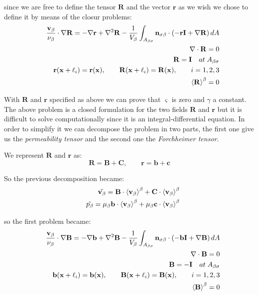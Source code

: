 since we are free to define the tensor $\mathbf{R}$  and the vector $\mathbf{r}$ as we wish we chose to define it by means of the closur problems:
\begin{eqnarray}
&& \dfrac{\textbf{v}_{\beta}}{\nu_{\beta}} \cdot  \nabla \mathbf{R} = -\nabla \mathbf{r} + \nabla^2 \mathbf{R} - \dfrac{1}{V_\beta} \int_{A_{\beta \sigma}} \mathbf{n}_{\sigma \beta} \cdot \left(-\mathbf{r}\mathbf{I}  +  \nabla \mathbf{R} \right) dA  \\
&& \nabla \cdot \mathbf{R} = 0  \\
&&\mathbf{R} = \mathbf{I} \quad at \; A_{\beta \sigma} \\
&& \mathbf{r}(\mathbf{x} +\ell_i) = \mathbf{r}(\mathbf{x}), \qquad \mathbf{R}(\mathbf{x} +\ell_i) = \mathbf{R}(\mathbf{x}), \qquad i=1,2,3 \\
&& {\left< \mathbf{R} \right>}^{\beta} = 0
\label{eq:R_problem}
\end{eqnarray}

With  $\mathbf{R}$ and $\mathbf{r}$ specified as above we can prove that $\boldsymbol{\varsigma}$ is zero and $\gamma$ a constant.
The above problem is a closed formulation for the two fields  $\mathbf{R}$ and $\mathbf{r}$ but it is difficult to solve computationally since it is an integral-differential equation.
In order to simplify it we can decompose the problem in two parts, the first one give us the \textit{permeability tensor} and the second one the \textit{Forchheimer tensor}.

We represent $\mathbf{R}$ and $\mathbf{r}$ as:
$$
 \mathbf{R} = \mathbf{B} + \mathbf{C}, \qquad \mathbf{r} = \mathbf{b} + \mathbf{c}
$$

So the previous decomposition became:
\begin{eqnarray}
	&& \tilde{\textbf{v}_{\beta}} = \mathbf{B} \cdot {\left< \textbf{v}_{\beta}\right>}^{\beta} + \mathbf{C} \cdot {\left< \textbf{v}_{\beta}\right>}^{\beta}  \\
	&& \tilde{p_{\beta}} = \mu_{\beta} \mathbf{b} \cdot {\left< \textbf{v}_{\beta}\right>}^{\beta} + \mu_{\beta} \mathbf{c} \cdot {\left< \textbf{v}_{\beta}\right>}^{\beta} 
\end{eqnarray}

so the first problem became:
\begin{eqnarray}
&& \dfrac{\textbf{v}_{\beta}}{\nu_{\beta}} \cdot  \nabla \mathbf{B} = -\nabla \mathbf{b} + \nabla^2 \mathbf{B} - \dfrac{1}{V_\beta} \int_{A_{\beta \sigma}} \mathbf{n}_{\sigma \beta} \cdot \left(-\mathbf{b}\mathbf{I}  +  \nabla \mathbf{B} \right) dA  \\
&& \nabla \cdot \mathbf{B} = 0  \\
&&\mathbf{B} = -\mathbf{I} \quad at \; A_{\beta \sigma} \\
&& \mathbf{b}(\mathbf{x} +\ell_i) = \mathbf{b}(\mathbf{x}), \qquad \mathbf{B}(\mathbf{x} +\ell_i) = \mathbf{B}(\mathbf{x}), \qquad i=1,2,3 \\
&& {\left< \mathbf{B} \right>}^{\beta} = 0
\label{eq:B_problem}
\end{eqnarray}


